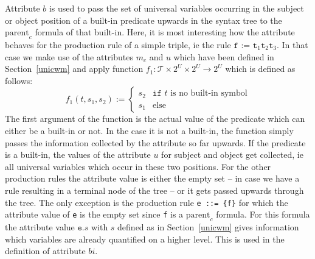 Attribute $b$ is used to pass the set of universal variables occurring in the subject or object position of a built-in predicate upwards in the syntax tree to the 
$\text{parent}_c$ formula of that built-in. Here, it is most interesting how the attribute behaves for the production rule of a simple triple, 
ie the rule $\texttt{f := t}_1 \texttt{t}_2 \texttt{t}_3$. In that case we make use of the attributes $m_c$ and $u$ which have been defined in Section~\ref{unicwm} 
and apply function $f_1: \mathcal{T}\times 2^{U}\times 2^{U}\rightarrow 2^{U}$  which 
is defined as follows: 
%
\[
 f_1(t, s_1, s_2) :=\begin{cases} s_2 & \texttt{if } t \text{ is no built-in symbol} \\ s_1 & \text{else} \end{cases} 
\]
The first argument of the function is the actual value of the predicate which can either be a built-in or not. In the case it is not a built-in, 
the function simply passes the information collected by the attribute so far upwards. If the predicate is a built-in, the values of the attribute $u$ for
subject and object get 
collected, ie all universal variables which occur in these two positions. For the other production rules the attribute value is either the empty set 
-- in case we have a rule resulting in a terminal node of the tree -- or it gets passed upwards through the tree. The only exception is the production rule
\texttt{e ::= \{f\}} for which the attribute value of \texttt{e} is the empty set since \texttt{f} is a $\text{parent}_c$ formula. For this formula the attribute 
value $\texttt{e}.s$ with $s$ defined as in Section~\ref{unicwm} gives information which variables are already quantified on a higher level. This is used 
in the definition of attribute $bi$.

